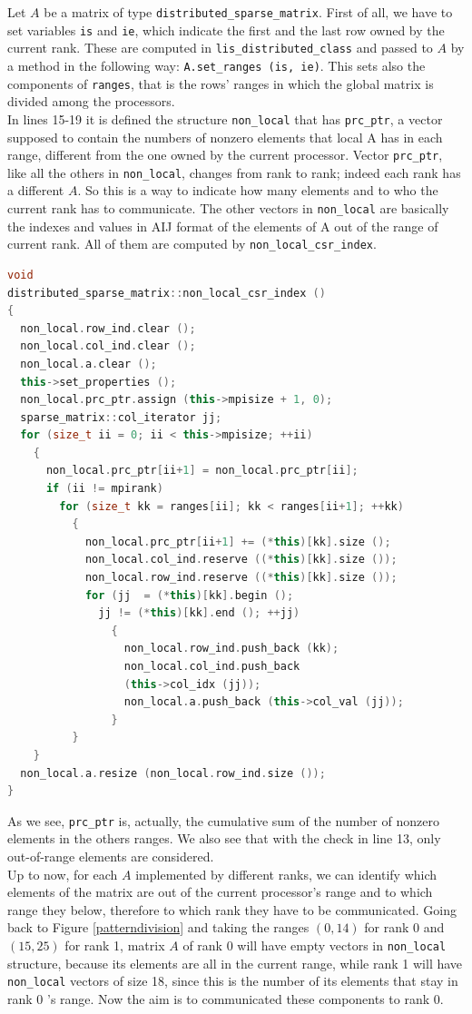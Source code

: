 Let $ A $ be a matrix of type \texttt{distributed\_sparse\_matrix}. First of all, we have to set variables \texttt{is} and \texttt{ie}, which indicate the first and the last row owned by the current rank. These are computed in \texttt{lis\_distributed\_class} and passed to $ A $ by a method in the following way: \texttt{A.set\_ranges (is, ie)}. This sets also the components of \texttt{ranges}, that is the rows' ranges in which the global matrix is divided among the processors.\\
In lines 15-19 it is defined the structure \texttt{non\_local} that has \texttt{prc\_ptr}, a vector supposed to contain the numbers of nonzero elements that local A has in each range, different from the one owned by the current processor. Vector \texttt{prc\_ptr}, like all the others in \texttt{non\_local}, changes from rank to rank; indeed each rank has a different $ A $. So this is a way to indicate how many elements and to who the current rank has to communicate. The other vectors in \texttt{non\_local} are basically the indexes and values in AIJ format of the elements of A out of the range of current rank. All of them are computed by \texttt{non\_local\_csr\_index}. 
\begin{lstlisting}[language=C++, caption={distributed\_sparse\_matrix::non\_local\_csr\_index ()}]
void
distributed_sparse_matrix::non_local_csr_index ()
{
  non_local.row_ind.clear ();
  non_local.col_ind.clear ();
  non_local.a.clear ();
  this->set_properties ();
  non_local.prc_ptr.assign (this->mpisize + 1, 0);
  sparse_matrix::col_iterator jj;
  for (size_t ii = 0; ii < this->mpisize; ++ii)
    {
      non_local.prc_ptr[ii+1] = non_local.prc_ptr[ii];
	  if (ii != mpirank)
	    for (size_t kk = ranges[ii]; kk < ranges[ii+1]; ++kk)
		  {
			non_local.prc_ptr[ii+1] += (*this)[kk].size ();
			non_local.col_ind.reserve ((*this)[kk].size ());
			non_local.row_ind.reserve ((*this)[kk].size ());
			for (jj  = (*this)[kk].begin ();
			  jj != (*this)[kk].end (); ++jj)
		        {
				  non_local.row_ind.push_back (kk);
				  non_local.col_ind.push_back 
				  (this->col_idx (jj));
				  non_local.a.push_back (this->col_val (jj));
				}
		  }
    }
  non_local.a.resize (non_local.row_ind.size ());
}
\end{lstlisting}
As we see, \texttt{prc\_ptr} is, actually, the cumulative sum of the number of nonzero elements in the others ranges. We also see that with the check in line 13, only out-of-range elements are considered.\\
Up to now, for each $ A $ implemented by different ranks, we can identify which elements of the matrix are out of the current processor's range and to which range they below, therefore to which rank they have to be communicated. Going back to Figure \ref{patterndivision} and taking the ranges $ (0,14) $ for rank 0 and $ (15,25) $ for rank 1, matrix $ A $ of rank 0 will have empty vectors in \texttt{non\_local} structure, because its elements are all in the current range, while rank 1 will have \texttt{non\_local} vectors of size 18, since this is the number of its elements that stay in rank 0 's range. Now the aim is to communicated these components to rank 0.
